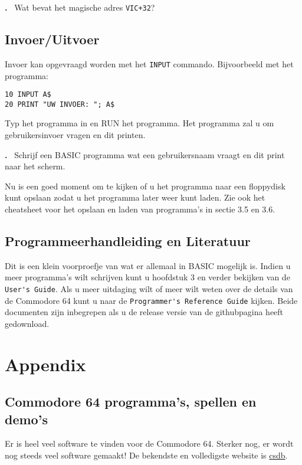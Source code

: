 \documentclass{article}
\newcounter{problem}
\newcounter{solution}
\newcommand\problem{%
  \stepcounter{problem}%
  \textbf{\theproblem.}~%
  \setcounter{solution}{0}%
}
\begin{document}
\problem Wat bevat het magische adres \verb:VIC+32:?

\subsection{Invoer/Uitvoer}

Invoer kan opgevraagd worden met het \verb:INPUT: commando.
Bijvoorbeeld met het programma:

\begin{lstlisting}
10 INPUT A$
20 PRINT "UW INVOER: "; A$
\end{lstlisting}

Typ het programma in en RUN het programma.
Het programma zal u om gebruikersinvoer vragen en dit printen.

\problem Schrijf een BASIC programma wat een gebruikersnaam vraagt en dit print naar het scherm.

Nu is een goed moment om te kijken of u het programma naar een floppydisk kunt opslaan zodat u het programma later weer kunt laden.
Zie ook het cheatsheet voor het opslaan en laden van programma's in sectie 3.5 en 3.6.

\subsection{Programmeerhandleiding en Literatuur}

Dit is een klein voorproefje van wat er allemaal in BASIC mogelijk is.
Indien u meer programma's wilt schrijven kunt u hoofdstuk 3 en verder bekijken van de \verb:User's Guide:.
Als u meer uitdaging wilt of meer wilt weten over de details van de Commodore 64 kunt u naar de \verb:Programmer's Reference Guide: kijken.
Beide documenten zijn inbegrepen als u de release versie van de githubpagina heeft gedownload.

\section{Appendix}

\subsection{Commodore 64 programma's, spellen en demo's}

Er is heel veel software te vinden voor de Commodore 64.
Sterker nog, er wordt nog steeds veel software gemaakt!
De bekendste en volledigste website is \href{http://csdb.dk}{csdb}.
\end{document}
